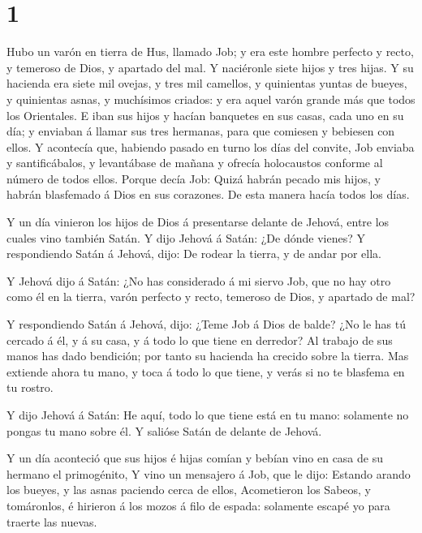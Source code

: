\hypertarget{section}{%
\section{1}\label{section}}

 Hubo un varón en tierra de Hus, llamado Job; y era este
hombre perfecto y recto, y temeroso de Dios, y apartado del mal.
 Y naciéronle siete hijos y tres hijas.  Y su
hacienda era siete mil ovejas, y tres mil camellos, y quinientas yuntas
de bueyes, y quinientas asnas, y muchísimos criados: y era aquel varón
grande más que todos los Orientales.  E iban sus hijos y
hacían banquetes en sus casas, cada uno en su día; y enviaban á llamar
sus tres hermanas, para que comiesen y bebiesen con ellos. 
Y acontecía que, habiendo pasado en turno los días del convite, Job
enviaba y santificábalos, y levantábase de mañana y ofrecía holocaustos
conforme al número de todos ellos. Porque decía Job: Quizá habrán pecado
mis hijos, y habrán blasfemado á Dios en sus corazones. De esta manera
hacía todos los días.

 Y un día vinieron los hijos de Dios á presentarse delante
de Jehová, entre los cuales vino también Satán.  Y dijo
Jehová á Satán: ¿De dónde vienes? Y respondiendo Satán á Jehová, dijo:
De rodear la tierra, y de andar por ella.

 Y Jehová dijo á Satán: ¿No has considerado á mi siervo Job,
que no hay otro como él en la tierra, varón perfecto y recto, temeroso
de Dios, y apartado de mal?

 Y respondiendo Satán á Jehová, dijo: ¿Teme Job á Dios de
balde?  ¿No le has tú cercado á él, y á su casa, y á todo
lo que tiene en derredor? Al trabajo de sus manos has dado bendición;
por tanto su hacienda ha crecido sobre la tierra.  Mas
extiende ahora tu mano, y toca á todo lo que tiene, y verás si no te
blasfema en tu rostro.

 Y dijo Jehová á Satán: He aquí, todo lo que tiene está en
tu mano: solamente no pongas tu mano sobre él. Y salióse Satán de
delante de Jehová.

 Y un día aconteció que sus hijos é hijas comían y bebían
vino en casa de su hermano el primogénito,  Y vino un
mensajero á Job, que le dijo: Estando arando los bueyes, y las asnas
paciendo cerca de ellos,  Acometieron los Sabeos, y
tomáronlos, é hirieron á los mozos á filo de espada: solamente escapé yo
para traerte las nuevas.

